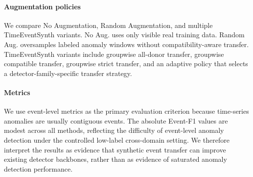 \documentclass[conference]{IEEEtran}
\begin{document}
\paragraph{Augmentation policies}
We compare No Augmentation, Random Augmentation, and multiple TimeEventSynth variants. No Aug. uses only visible real training data. Random Aug. oversamples labeled anomaly windows without compatibility-aware transfer. TimeEventSynth variants include groupwise all-donor transfer, groupwise compatible transfer, groupwise strict transfer, and an adaptive policy that selects a detector-family-specific transfer strategy.

\paragraph{Metrics}
We use event-level metrics as the primary evaluation criterion because time-series anomalies are usually contiguous events. The absolute Event-F1 values are modest across all methods, reflecting the difficulty of event-level anomaly detection under the controlled low-label cross-domain setting. We therefore interpret the results as evidence that synthetic event transfer can improve existing detector backbones, rather than as evidence of saturated anomaly detection performance.

\end{document}
